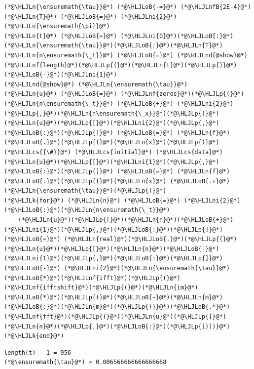\documentclass[12pt,a4paper]{article}
\newcommand{\HLJLk}[1]{\textcolor[RGB]{148,91,176}{\textbf{#1}}}
\newcommand{\HLJLn}[1]{#1}
\newcommand{\HLJLnd}[1]{\textcolor[RGB]{214,102,97}{#1}}
\newcommand{\HLJLnf}[1]{\textcolor[RGB]{66,102,213}{#1}}
\newcommand{\HLJLnfB}[1]{\textcolor[RGB]{59,151,46}{#1}}
\newcommand{\HLJLni}[1]{\textcolor[RGB]{59,151,46}{#1}}
\newcommand{\HLJLoB}[1]{\textcolor[RGB]{102,102,102}{\textbf{#1}}}
\newcommand{\HLJLp}[1]{#1}
\newcommand{\HLJLcs}[1]{\textcolor[RGB]{153,153,119}{\textit{#1}}}
\begin{document}
\begin{lstlisting}
(*@\HLJLn{\ensuremath{\tau}}@*) (*@\HLJLoB{-=}@*) (*@\HLJLnfB{2E-4}@*)
(*@\HLJLn{T}@*) (*@\HLJLoB{=}@*) (*@\HLJLni{2}@*)(*@\HLJLn{\ensuremath{\pi}}@*)
(*@\HLJLn{t}@*) (*@\HLJLoB{=}@*) (*@\HLJLni{0}@*)(*@\HLJLoB{:}@*)(*@\HLJLn{\ensuremath{\tau}}@*)(*@\HLJLoB{:}@*)(*@\HLJLn{T}@*)
(*@\HLJLn{n\ensuremath{\_t}}@*) (*@\HLJLoB{=}@*) (*@\HLJLnd{@show}@*) (*@\HLJLnf{length}@*)(*@\HLJLp{(}@*)(*@\HLJLn{t}@*)(*@\HLJLp{)}@*)(*@\HLJLoB{-}@*)(*@\HLJLni{1}@*)
(*@\HLJLnd{@show}@*) (*@\HLJLn{\ensuremath{\tau}}@*)
(*@\HLJLn{u}@*) (*@\HLJLoB{=}@*) (*@\HLJLnf{zeros}@*)(*@\HLJLp{(}@*)(*@\HLJLn{n\ensuremath{\_t}}@*) (*@\HLJLoB{+}@*) (*@\HLJLni{2}@*)(*@\HLJLp{,}@*)(*@\HLJLn{n\ensuremath{\_x}}@*)(*@\HLJLp{)}@*)
(*@\HLJLn{u}@*)(*@\HLJLp{[}@*)(*@\HLJLni{2}@*)(*@\HLJLp{,}@*)(*@\HLJLoB{:}@*)(*@\HLJLp{]}@*) (*@\HLJLoB{=}@*) (*@\HLJLn{f}@*)(*@\HLJLoB{.}@*)(*@\HLJLp{(}@*)(*@\HLJLn{x}@*)(*@\HLJLp{)}@*)  (*@\HLJLcs{{\#}}@*) (*@\HLJLcs{initial}@*) (*@\HLJLcs{data}@*)
(*@\HLJLn{u}@*)(*@\HLJLp{[}@*)(*@\HLJLni{1}@*)(*@\HLJLp{,}@*)(*@\HLJLoB{:}@*)(*@\HLJLp{]}@*) (*@\HLJLoB{=}@*) (*@\HLJLn{f}@*)(*@\HLJLoB{.}@*)(*@\HLJLp{(}@*)(*@\HLJLn{x}@*) (*@\HLJLoB{.+}@*) (*@\HLJLn{\ensuremath{\tau}}@*)(*@\HLJLp{)}@*)
(*@\HLJLk{for}@*) (*@\HLJLn{n}@*) (*@\HLJLoB{=}@*) (*@\HLJLni{2}@*)(*@\HLJLoB{:}@*)(*@\HLJLn{n\ensuremath{\_t}}@*)
    (*@\HLJLn{u}@*)(*@\HLJLp{[}@*)(*@\HLJLn{n}@*)(*@\HLJLoB{+}@*)(*@\HLJLni{1}@*)(*@\HLJLp{,}@*)(*@\HLJLoB{:}@*)(*@\HLJLp{]}@*) (*@\HLJLoB{=}@*) (*@\HLJLn{real}@*)(*@\HLJLoB{.}@*)(*@\HLJLp{(}@*)(*@\HLJLn{u}@*)(*@\HLJLp{[}@*)(*@\HLJLn{n}@*)(*@\HLJLoB{-}@*)(*@\HLJLni{1}@*)(*@\HLJLp{,}@*)(*@\HLJLoB{:}@*)(*@\HLJLp{]}@*) (*@\HLJLoB{-}@*) (*@\HLJLni{2}@*)(*@\HLJLn{\ensuremath{\tau}}@*)(*@\HLJLoB{*}@*)(*@\HLJLnf{ifft}@*)(*@\HLJLp{(}@*)(*@\HLJLnf{ifftshift}@*)(*@\HLJLp{(}@*)(*@\HLJLn{im}@*)(*@\HLJLoB{*}@*)(*@\HLJLp{(}@*)(*@\HLJLoB{-}@*)(*@\HLJLn{m}@*)(*@\HLJLoB{:}@*)(*@\HLJLn{m}@*)(*@\HLJLp{))}@*)(*@\HLJLoB{.*}@*)(*@\HLJLnf{fft}@*)(*@\HLJLp{(}@*)(*@\HLJLn{u}@*)(*@\HLJLp{[}@*)(*@\HLJLn{n}@*)(*@\HLJLp{,}@*)(*@\HLJLoB{:}@*)(*@\HLJLp{])))}@*)
(*@\HLJLk{end}@*)
\end{lstlisting}

\begin{lstlisting}
length(t) - 1 = 956
(*@\ensuremath{\tau}@*) = 0.006566666666666668
\end{lstlisting}
\end{document}
